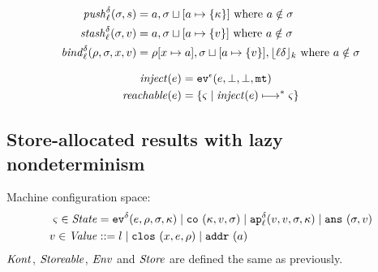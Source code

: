 \documentclass{llncs}
\newcommand{\inject}{\mathit{inject}}
\newcommand{\setof}[1]{\{ #1 \}}
\newcommand{\alt}{\mid}
\begin{document}
\begin{align*}
\mathit{push}_{\ell}^{\delta}(\sigma,s) &= a,\sigma\sqcup[a\mapsto\{\kappa\}]
\mbox{ where }a \notin\sigma
\\
\mathit{stash}_{\ell}^{\delta}(\sigma,v) &= a,\sigma\sqcup[a\mapsto\{v\}]
\mbox{ where }a \notin\sigma
\\
\mathit{bind}_{\ell}^{\delta}(\rho,\sigma,x,v) &= \rho[x\mapsto a],\sigma\sqcup[a\mapsto\{v\}],\lfloor {\ell}{\delta} \rfloor_k
\mbox{ where }a \notin\sigma
\end{align*}

\begin{align*}
\inject(\mexp) &= \ev[^\mtcntr]{\mexp,\bot,\bot,\kmt} \\
\reachable{\mexp} &= \setof{\mstate \mid \inject(\mexp) \machstep^* \mstate}
\end{align*}

\subsection{Store-allocated results with lazy nondeterminism}

Machine configuration space:
\begin{align*}
\mstate \in \State &= \ev[^\mcntr]{\mexp, \menv, \msto, \mkont} \alt
                     \co{\mkont, \mval, \msto} \alt
                     \ap[_\mlab^\mcntr]{\mval,\mval,\msto,\mkont} \alt
                     \ans{\msto,\mval}\\
\mval \in \Value &::= \mlit \alt
                      \clos{\mvar,\mexp,\menv} \alt
                      \saddr\maddr
\end{align*}
$\mathit{Kont}$, $\mathit{Storeable}$, $\mathit{Env}$ and $\mathit{Store}$ are defined the same as previously.
\end{document}
